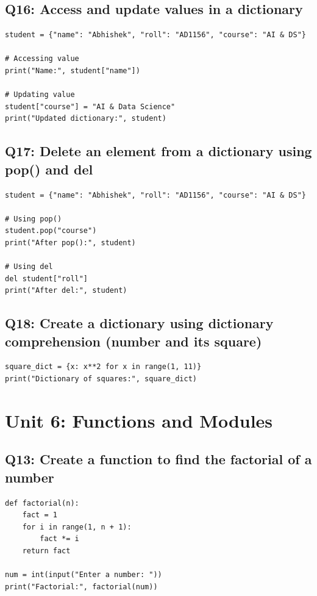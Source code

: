 \documentclass[11pt,a4paper]{article}
\begin{document}
\subsection{Q16: Access and update values in a dictionary}
\begin{lstlisting}
student = {"name": "Abhishek", "roll": "AD1156", "course": "AI & DS"}

# Accessing value
print("Name:", student["name"])

# Updating value
student["course"] = "AI & Data Science"
print("Updated dictionary:", student)
\end{lstlisting}

\subsection{Q17: Delete an element from a dictionary using pop() and del}
\begin{lstlisting}
student = {"name": "Abhishek", "roll": "AD1156", "course": "AI & DS"}

# Using pop()
student.pop("course")
print("After pop():", student)

# Using del
del student["roll"]
print("After del:", student)
\end{lstlisting}

\subsection{Q18: Create a dictionary using dictionary comprehension (number and its square)}
\begin{lstlisting}
square_dict = {x: x**2 for x in range(1, 11)}
print("Dictionary of squares:", square_dict)
\end{lstlisting}

\section{Unit 6: Functions and Modules}

\subsection{Q13: Create a function to find the factorial of a number}
\begin{lstlisting}
def factorial(n):
    fact = 1
    for i in range(1, n + 1):
        fact *= i
    return fact

num = int(input("Enter a number: "))
print("Factorial:", factorial(num))
\end{lstlisting}
\end{document}
